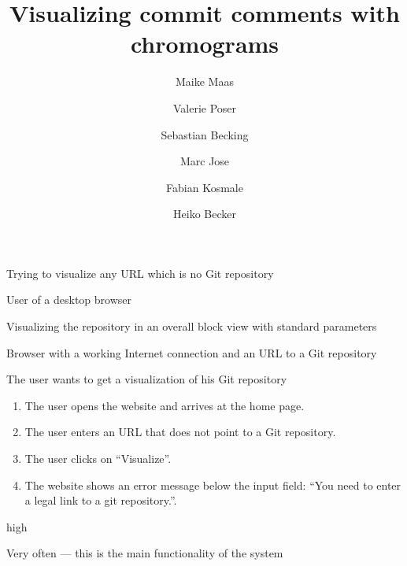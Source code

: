 \documentclass[11pt]{scrartcl}
\author{Maike Maas \and Valerie Poser \and Sebastian Becking \and
        Marc Jose \and Fabian Kosmale \and Heiko Becker}
\title{Visualizing commit comments with chromograms}
\begin{document}
\maketitle

\begin{description}[leftmargin=!,labelwidth=\widthof{\bfseries Frequency of use:}]
	\item[Use-case:] Trying to visualize any URL which is no Git repository
	\item[Primary actor:] User of a desktop browser 
	\item[Goal in context:] Visualizing the repository in an overall block view with standard parameters 
	\item[Preconditions:] Browser with a working Internet connection and an URL to a Git repository
	\item[Trigger:] The user wants to get a visualization of his Git repository 

	\item[Scenario:]
		\begin{enumerate}[leftmargin=1.5em]
			\item The user opens the website and arrives at the home page.
			\item The user enters an URL that does not point to a Git repository.
			\item The user clicks on \enquote{Visualize}.
			\item The website shows an error message below the input field:
				\enquote{You need to enter a legal link to a git repository.}.
		\end{enumerate}

	\item[Priority:] high
	\item[Frequency of use:] Very often --- this is the main functionality of the system

\end{description}
\end{document}
